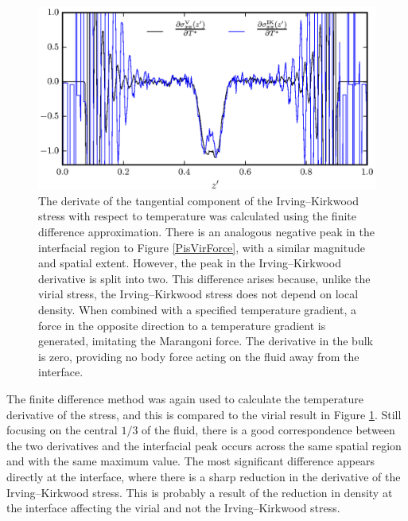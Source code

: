 \begin{figure}[h!]
\centering
\includegraphics[scale=1.0]{PisIKForce}
\caption{The derivate of the tangential component of the Irving--Kirkwood stress with respect to temperature was calculated using the finite difference approximation.
There is an analogous negative peak in the interfacial region to Figure \ref{PisVirForce}, with a similar magnitude and spatial extent.
However, the peak in the Irving--Kirkwood derivative is split into two.
This difference arises because, unlike the virial stress, the Irving--Kirkwood stress does not depend on local density.
When combined with a specified temperature gradient, a force in the opposite direction to a temperature gradient is generated, imitating the Marangoni force.
The derivative in the bulk is zero, providing no body force acting on the fluid away from the interface.
}
\label{PisIKForce}
\end{figure}
The finite difference method was again used to calculate the temperature derivative of the stress, and this is compared to the virial result in Figure \ref{PisIKForce}.
Still focusing on the central $1/3$ of the fluid, there is a good correspondence between the two derivatives and the interfacial peak occurs across the same spatial region and with the same maximum value.
The most significant difference appears directly at the interface, where there is a sharp reduction in the derivative of the Irving--Kirkwood stress.
This is probably a result of the reduction in density at the interface affecting the virial and not the Irving--Kirkwood stress.
\FloatBarrier

